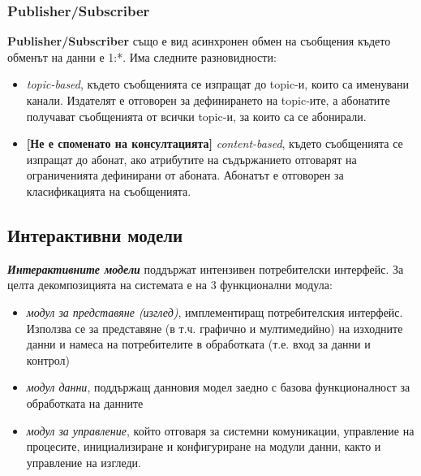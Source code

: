 \documentclass[fleqn,12pt]{article}
\begin{document}
\subsubsection{Publisher/Subscriber}
\textbf{Publisher/Subscriber} също е вид асинхронен обмен на съобщения където обменът на данни е 1:*.
Има следните разновидности:
\begin{itemize}
    \item \textit{topic-based}, където съобщенията се изпращат до topic-и, които са именувани канали.
    Издателят е отговорен за дефинирането на topic-ите, а абонатите получават съобщенията от всички topic-и, за които са се абонирали.
    \item \textbf{[Не е споменато на консултацията]} \textit{content-based}, където съобщенията се изпращат до абонат, ако атрибутите на съдържанието отговарят на ограниченията дефинирани от абоната.
    Абонатът е отговорен за класификацията на съобщенията.
\end{itemize}

\subsection{Интерактивни модели}

\textbf{\textit{Интерактивните модели}} поддържат интензивен потребителски интерфейс.
За целта декомпозицията на системата е на 3 функционални модула:
\begin{itemize}
    \item \textit{модул за представяне (изглед)}, имплементиращ потребителския интерфейс.
    Използва се за представяне (в т.ч. графично и мултимедийно) на изходните данни и намеса на потребителите в обработката (т.е. вход за данни и контрол)
    \item \textit{модул данни}, поддържащ данновия модел заедно с базова функционалност за обработката на данните
    \item \textit{модул за управление}, който отговаря за системни комуникации, управление на процесите, инициализиране и конфигуриране на модули данни, както и управление на изгледи.
\end{itemize}
\end{document}
